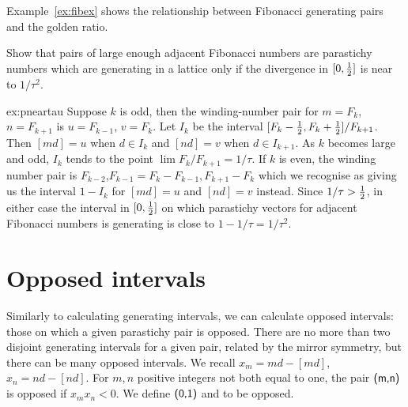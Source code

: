 Example~\ref{ex:fibex} shows the relationship between Fibonacci generating pairs and the golden ratio. 



\begin{jExercise}\label{ex:pneartau}
	Show that  pairs of large enough adjacent Fibonacci numbers are parastichy numbers which are generating in a lattice only if the divergence in $[0,\textstyle{\frac{1}{2}}]$ is near to $1/\tau^2$.
	\label{ex:fibex}
\end{jExercise}
\begin{jAnswer}{ex:pneartau}
	Suppose $k$ is odd, then the winding-number pair for 
	$m=F_k$, $n=F_{k+1}$ is $u=F_{k-1}$, $v=F_{k}$. 
	Let $I_k$ be the interval $[F_k-\textstyle{\frac{1}{2}},F_k+\textstyle{\frac{1}{2}}]/F_{k+1}$. 
	Then $[md]=u$ when $d\in I_k$ and $[nd]=v$ when $d\in I_{k+1}$.
	As $k$ becomes large and odd, $I_k$ tends to the point $\lim F_k/F_{k+1}=1/\tau$.
	If $k$ is even, the winding number pair is $F_{k-2}$,$F_{k-1} = F_{k}-F_{k-1},F_{k+1}-F_k$ which we recognise as giving us the interval $1-I_k$ for $[md]=u$ and $[nd]=v$ instead.  
Since $1/\tau>\textstyle{\frac{1}{2}}$, in either case the interval in $[0,\textstyle{\frac{1}{2}}]$ on which
parastichy vectors for adjacent Fibonacci numbers
 is generating is close to $1-1/\tau=1/\tau^2$. 	
\end{jAnswer}



\section{Opposed intervals}
Similarly to calculating generating intervals, we can calculate opposed intervals: those on which a given parastichy pair is opposed. There are no more than two disjoint generating intervals for a given pair, related by the mirror symmetry, but there can be many opposed intervals. 
We recall 
$
x_m = m d - [ m d]$,
$
x_n = n d - [ n d ].
$
For $m,n$ positive integers not both equal to one, the pair $\textsf{(m,n)}$ is {opposed} if $x_m x_n <0$.
We define $\textsf{(0,1)}$  and   to be opposed.

